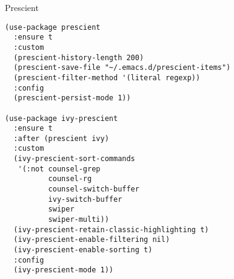 \documentclass[12pt]{article}
\begin{document}
Prescient 
\begin{verbatim}
(use-package prescient
  :ensure t
  :custom
  (prescient-history-length 200)
  (prescient-save-file "~/.emacs.d/prescient-items")
  (prescient-filter-method '(literal regexp))
  :config
  (prescient-persist-mode 1))

(use-package ivy-prescient
  :ensure t
  :after (prescient ivy)
  :custom
  (ivy-prescient-sort-commands
   '(:not counsel-grep
          counsel-rg
          counsel-switch-buffer
          ivy-switch-buffer
          swiper
          swiper-multi))
  (ivy-prescient-retain-classic-highlighting t)
  (ivy-prescient-enable-filtering nil)
  (ivy-prescient-enable-sorting t)
  :config
  (ivy-prescient-mode 1))

\end{verbatim}
\end{document}
